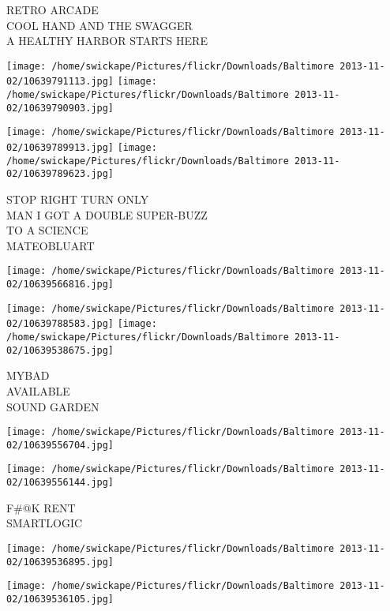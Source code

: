 \documentclass[10pt,letterpaper]{article}
\begin{document}
RETRO ARCADE\\
COOL HAND AND THE SWAGGER\\
A HEALTHY HARBOR STARTS HERE\\
\pagebreak

\texttt{[image: /home/swickape/Pictures/flickr/Downloads/Baltimore 2013-11-02/10639791113.jpg]}
\texttt{[image: /home/swickape/Pictures/flickr/Downloads/Baltimore 2013-11-02/10639790903.jpg]}

\texttt{[image: /home/swickape/Pictures/flickr/Downloads/Baltimore 2013-11-02/10639789913.jpg]}
\texttt{[image: /home/swickape/Pictures/flickr/Downloads/Baltimore 2013-11-02/10639789623.jpg]}

STOP RIGHT TURN ONLY\\
MAN I GOT A DOUBLE SUPER{-}BUZZ\\
TO A SCIENCE\\
MATEOBLUART\\
\pagebreak

\texttt{[image: /home/swickape/Pictures/flickr/Downloads/Baltimore 2013-11-02/10639566816.jpg]}

\vspace{0.25in}
\texttt{[image: /home/swickape/Pictures/flickr/Downloads/Baltimore 2013-11-02/10639788583.jpg]}
\texttt{[image: /home/swickape/Pictures/flickr/Downloads/Baltimore 2013-11-02/10639538675.jpg]}

MYBAD\\
AVAILABLE\\
SOUND GARDEN\\
\pagebreak

\texttt{[image: /home/swickape/Pictures/flickr/Downloads/Baltimore 2013-11-02/10639556704.jpg]}

\vspace{0.25in}
\texttt{[image: /home/swickape/Pictures/flickr/Downloads/Baltimore 2013-11-02/10639556144.jpg]}

F\#@K RENT\\
SMARTLOGIC\\
\pagebreak

\texttt{[image: /home/swickape/Pictures/flickr/Downloads/Baltimore 2013-11-02/10639536895.jpg]}

\vspace{0.25in}
\texttt{[image: /home/swickape/Pictures/flickr/Downloads/Baltimore 2013-11-02/10639536105.jpg]}
\end{document}
